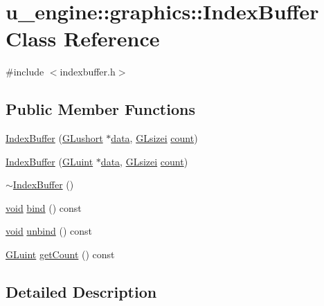 \hypertarget{classu__engine_1_1graphics_1_1_index_buffer}{}\section{u\+\_\+engine\+:\+:graphics\+:\+:Index\+Buffer Class Reference}
\label{classu__engine_1_1graphics_1_1_index_buffer}


{\ttfamily \#include $<$indexbuffer.\+h$>$}

\subsection*{Public Member Functions}
\begin{DoxyCompactItemize}
\item 
\hyperlink{classu__engine_1_1graphics_1_1_index_buffer_a34f1387eba8e2e1b36e70f0e6dd18aad}{Index\+Buffer} (\hyperlink{glew_8h_ac995a558f6571eb5f98b7a6d2b2a4468}{G\+Lushort} $\ast$\hyperlink{glew_8h_a42c2b1d86fa71a425e73a882cb0a72c8}{data}, \hyperlink{glew_8h_a9289d5b99dc1f27f01480360f2e18ae0}{G\+Lsizei} \hyperlink{glew_8h_a10b284d589000663becfbc6867a3a9f7}{count})
\item 
\hyperlink{classu__engine_1_1graphics_1_1_index_buffer_a3db35637755fd34e8adae039f9d6f7c8}{Index\+Buffer} (\hyperlink{glew_8h_a68c4714e43d8e827d80759f9cb864f3c}{G\+Luint} $\ast$\hyperlink{glew_8h_a42c2b1d86fa71a425e73a882cb0a72c8}{data}, \hyperlink{glew_8h_a9289d5b99dc1f27f01480360f2e18ae0}{G\+Lsizei} \hyperlink{glew_8h_a10b284d589000663becfbc6867a3a9f7}{count})
\item 
\hyperlink{classu__engine_1_1graphics_1_1_index_buffer_adb1ac6c7a5cb61f6be02874f71d8257b}{$\sim$\+Index\+Buffer} ()
\item 
\hyperlink{wglew_8h_aeea6e3dfae3acf232096f57d2d57f084}{void} \hyperlink{classu__engine_1_1graphics_1_1_index_buffer_abfe5030965d9aec354dd21999ed34185}{bind} () const 
\item 
\hyperlink{wglew_8h_aeea6e3dfae3acf232096f57d2d57f084}{void} \hyperlink{classu__engine_1_1graphics_1_1_index_buffer_ab917e66feff8da48503e3943d47855f3}{unbind} () const 
\item 
\hyperlink{glew_8h_a68c4714e43d8e827d80759f9cb864f3c}{G\+Luint} \hyperlink{classu__engine_1_1graphics_1_1_index_buffer_af69bbec43b691d938d65d7ac5ddf8994}{get\+Count} () const 
\end{DoxyCompactItemize}


\subsection{Detailed Description}


